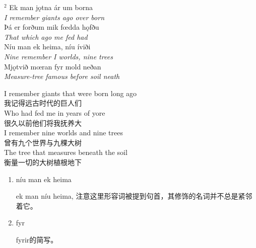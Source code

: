 \begin{paracol}{2}
    \noindent
    $^2 $ Ek man jǫtna ár um borna\\
    \textit{I remember giants ago over born}\\
    Þá er forðum mik fœdda hǫfðu\\
    \textit{That which ago me fed had}\\
    Níu man ek heima, níu íviði\\
    \textit{Nine remember I worlds, nine trees}\\
    Mjǫtvið mœran fyr mold neðan\\
    \textit{Measure-tree famous before soil neath}\\
    \switchcolumn

    \noindent
    I remember giants that were born long ago\\
    我记得远古时代的巨人们\\
    Who had fed me in years of yore\\
    很久以前他们将我抚养大\\
    I remember nine worlds and nine trees\\
    曾有九个世界与九棵大树\\
    The tree that measures beneath the soil\\
    衡量一切的大树植根地下\\

\end{paracol}

\begin{grammar*}{}
    \begin{enumerate}[leftmargin=*]
        \item níu man ek heima

              ek man níu heima, 注意这里形容词被提到句首，其修饰的名词并不总是紧邻着它。

        \item fyr

              fyrir的简写。
    \end{enumerate}
\end{grammar*}
\hspace*{\fill}\\ %

